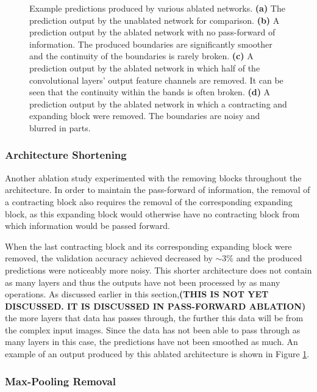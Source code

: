 \begin{figure}[!t]
\begin{subfigure}[t]{0.24\textwidth}
        \caption{}
    \end{subfigure}
    \caption{Example predictions produced by various ablated networks. \textbf{(a)} The prediction output by the unablated network for comparison. \textbf{(b)} A prediction output by the ablated network with no pass-forward of information. The produced boundaries are significantly smoother and the continuity of the boundaries is rarely broken. \textbf{(c)} A prediction output by the ablated network in which half of the convolutional layers' output feature channels are removed. It can be seen that the continuity within the bands is often broken. \textbf{(d)} A prediction output by the ablated network in which a contracting and expanding block were removed. The boundaries are noisy and blurred in parts.}
    \label{fig:ablation}
\end{figure}

\subsubsection{Architecture Shortening}

Another ablation study experimented with the removing blocks throughout the architecture. In order to maintain the pass-forward of information, the removal of a contracting block also requires the removal of the corresponding expanding block, as this expanding block would otherwise have no contracting block from which information would be passed forward.

When the last contracting block and its corresponding expanding block were removed, the validation accuracy achieved decreased by ${\sim}3\%$ and the produced predictions were noticeably more noisy. This shorter architecture does not contain as many layers and thus the outputs have not been processed by as many operations. As discussed earlier in this section,\textbf{(THIS IS NOT YET DISCUSSED. IT IS DISCUSSED IN PASS-FORWARD ABLATION)} the more layers that data has passes through, the further this data will be from the complex input images. Since the data has not been able to pass through as many layers in this case, the predictions have not been smoothed as much. An example of an output produced by this ablated architecture is shown in Figure \ref{fig:ablation}.

\subsubsection{Max-Pooling Removal}


